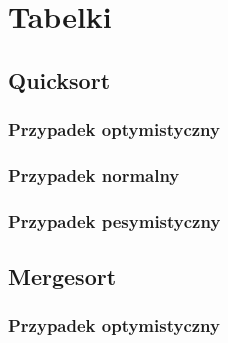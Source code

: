 \documentclass[12pt, polish]{article}
\begin{document}
\newpage
\section{Tabelki}

\subsection{Quicksort}

\subsubsection{Przypadek optymistyczny}

\begin{table}[htb]
    \centering
    \label{table:tablename}
	\quad
\end{table}

\subsubsection{Przypadek normalny}

\begin{table}[htb]
    \centering
    \label{table:tablename}
	\quad
\end{table}

\subsubsection{Przypadek pesymistyczny}

\begin{table}[htb]
    \centering
    \label{table:tablename}
	\quad
\end{table}

\newpage
\subsection{Mergesort}

\subsubsection{Przypadek optymistyczny}

\begin{table}[htb]
    \centering
    \label{table:tablename}
	\quad
\end{table}
\end{document}
